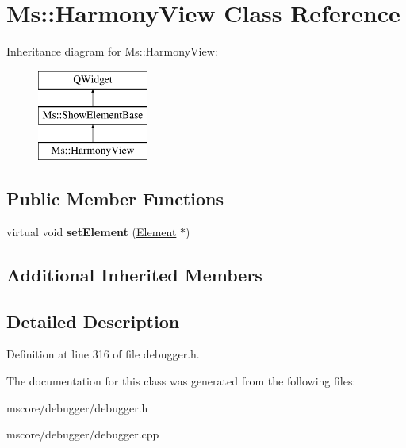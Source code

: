 \hypertarget{class_ms_1_1_harmony_view}{}\section{Ms\+:\+:Harmony\+View Class Reference}
\label{class_ms_1_1_harmony_view}
Inheritance diagram for Ms\+:\+:Harmony\+View\+:\begin{figure}[H]
\begin{center}
\leavevmode
\includegraphics[height=3.000000cm]{class_ms_1_1_harmony_view}
\end{center}
\end{figure}
\subsection*{Public Member Functions}
\begin{DoxyCompactItemize}
\item 
\mbox{\label{class_ms_1_1_harmony_view_a4fd3110e6a1d9fc1543e9a3234c5e3e2}} 
virtual void {\bfseries set\+Element} (\hyperlink{class_ms_1_1_element}{Element} $\ast$)
\end{DoxyCompactItemize}
\subsection*{Additional Inherited Members}


\subsection{Detailed Description}


Definition at line 316 of file debugger.\+h.



The documentation for this class was generated from the following files\+:\begin{DoxyCompactItemize}
\item 
mscore/debugger/debugger.\+h\item 
mscore/debugger/debugger.\+cpp\end{DoxyCompactItemize}
